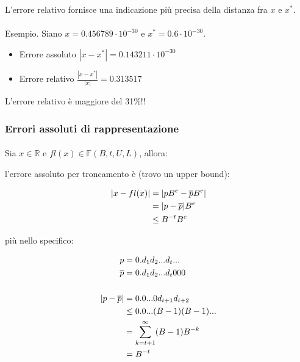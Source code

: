\documentclass[a4paper, 11pt]{article}
\begin{document}
        L’errore relativo fornisce una indicazione più precisa della distanza fra $x$ e $x^*$.

        \paragraph{}

        Esempio. Siano $x = 0.456789\cdot10^{-30}$ e $x^* = 0.6 \cdot 10^{-30}$.

        \begin{itemize}
            \item Errore assoluto  $|x-x^*| = 0.143211\cdot10^{-30}$
            \item Errore relativo $\frac{|x-x^*|}{|x|} = 0.313517$
        \end{itemize}

        L’errore relativo è maggiore del 31\%!!

        \subsubsection{Errori assoluti di rappresentazione}

        \paragraph{}

        Sia $x \in \mathbb{R}$ e $fl(x) \in \mathbb{F}(B, t, U, L )$, allora:

        l'errore assoluto per troncamento è (trovo un upper bound):



        \begin{align}
            |x - fl(x)| &= |pB^e - \overline{p} B^e| \notag \\
            &= |p - \overline{p}| B^e \notag \\ 
            &\leq B^{-t} B^e \notag
        \end{align}

        più nello specifico: 

        \begin{align}
            p &= 0.d_1d_2...d_t... \notag \\
            \overline{p} &= 0.d_1d_2...d_t000 \notag \\ 
            \notag \\
            |p-\overline{p}| &= 0.0...0d_{t+1}d_{t+2}\notag \\
            &\leq 0.0...(B-1)(B-1)... \notag \\
            &= \sum_{k = t+1}^{\infty} (B-1)B^{-k} \notag \\
            &= B^{-t} \notag 
        \end{align}
\end{document}
